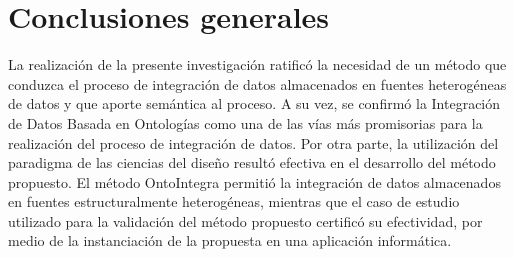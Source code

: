 \chapter*{\large Conclusiones generales}



La realización de la presente investigación ratificó la necesidad de un método que conduzca el proceso de integración de datos almacenados en fuentes heterogéneas de datos y que aporte semántica al proceso. A su vez, se confirmó la Integración de Datos Basada en Ontologías como una de las vías más promisorias para la realización del proceso de integración de datos. Por otra parte, la utilización del paradigma de las ciencias del diseño resultó efectiva en el desarrollo del método propuesto. El método OntoIntegra permitió la integración de datos almacenados en fuentes estructuralmente heterogéneas, mientras que el caso de estudio utilizado para la validación del método propuesto certificó su efectividad, por medio de la instanciación de la propuesta en una aplicación informática.
